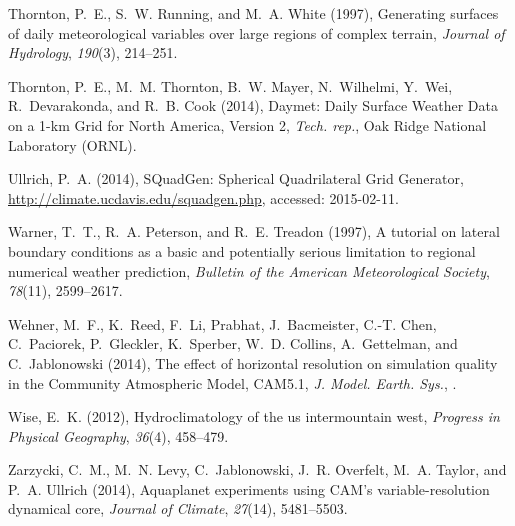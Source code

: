 \documentclass[draft,ms]{agutex}   %
\begin{document}
\begin{article}
\begin{thebibliography}{72}
Thornton, P.~E., S.~W. Running, and M.~A. White (1997), Generating surfaces of
  daily meteorological variables over large regions of complex terrain,
  \textit{Journal of Hydrology}, \textit{190}(3), 214--251.

Thornton, P.~E., M.~M. Thornton, B.~W. Mayer, N.~Wilhelmi, Y.~Wei,
  R.~Devarakonda, and R.~B. Cook (2014), {Daymet: Daily Surface Weather Data on
  a 1-km Grid for North America, Version 2}, \textit{Tech. rep.}, Oak Ridge
  National Laboratory (ORNL).

Ullrich, P.~A. (2014), {SQuadGen: Spherical Quadrilateral Grid Generator},
  \url{http://climate.ucdavis.edu/squadgen.php}, accessed: 2015-02-11.

Warner, T.~T., R.~A. Peterson, and R.~E. Treadon (1997), A tutorial on lateral
  boundary conditions as a basic and potentially serious limitation to regional
  numerical weather prediction, \textit{Bulletin of the American Meteorological
  Society}, \textit{78}(11), 2599--2617.

Wehner, M.~F., K.~Reed, F.~Li, Prabhat, J.~Bacmeister, C.-T. Chen, C.~Paciorek,
  P.~Gleckler, K.~Sperber, W.~D. Collins, A.~Gettelman, and C.~Jablonowski
  (2014), {The effect of horizontal resolution on simulation quality in the
  Community Atmospheric Model, CAM5.1}, \textit{J. Model. Earth. Sys.},
  .

Wise, E.~K. (2012), Hydroclimatology of the us intermountain west,
  \textit{Progress in Physical Geography}, \textit{36}(4), 458--479.

Zarzycki, C.~M., M.~N. Levy, C.~Jablonowski, J.~R. Overfelt, M.~A. Taylor, and
  P.~A. Ullrich (2014{}), {Aquaplanet experiments using CAM's
  variable-resolution dynamical core}, \textit{Journal of Climate},
  \textit{27}(14), 5481--5503.


\end{thebibliography}
\end{article}
\end{document}
